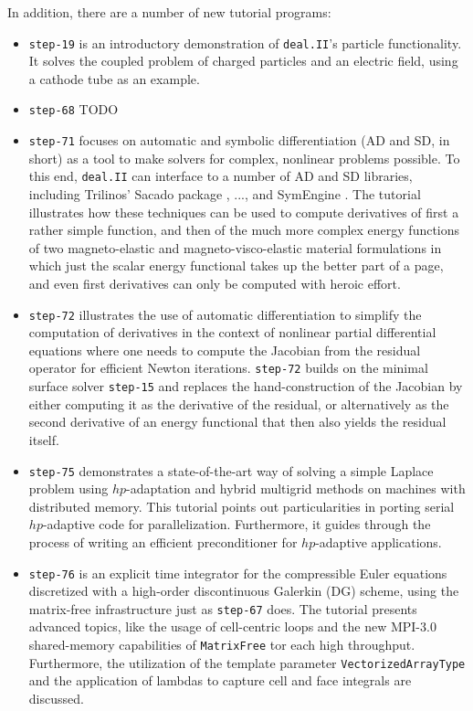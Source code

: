 \documentclass{ansarticle-preprint}
\newcommand{\specialword}[1]{\texttt{#1}}
\newcommand{\dealii}{{\specialword{deal.II}}\xspace}
\begin{document}
In addition, there are a number of new tutorial programs:
\begin{itemize}
\item \texttt{step-19} is an introductory demonstration of \dealii{}'s
  particle functionality. It solves the coupled problem of
  charged particles and an electric field, using a cathode tube as an
  example. 

\item \texttt{step-68} TODO

\item \texttt{step-71} focuses on automatic and symbolic
  differentiation (AD and SD, in short) as a tool to make solvers for complex, nonlinear
  problems possible. To this end, \dealii{} can interface to a number
  of AD and SD libraries, including Trilinos' Sacado package
  \cite{...}, ..., and SymEngine \cite{symengine-web-page}. The tutorial
  illustrates how these techniques can be used to compute derivatives
  of first a rather simple function, and then of the much more complex
  energy functions of two magneto-elastic and magneto-visco-elastic
  material formulations in which just the scalar energy functional
  takes up the better part of a page, and even first derivatives can
  only be computed with heroic effort.

\item \texttt{step-72} illustrates the use of automatic
  differentiation to simplify the computation of derivatives in the
  context of nonlinear partial differential equations where one needs
  to compute the Jacobian from the residual operator for efficient
  Newton iterations. \texttt{step-72} builds on the minimal surface
  solver \texttt{step-15} and replaces the hand-construction of the
  Jacobian by either computing it as the derivative of the residual,
  or alternatively as the second derivative of an energy functional
  that then also yields the residual itself.

\item \texttt{step-75} demonstrates a state-of-the-art way of solving a simple
      Laplace problem using $hp$-adaptation and hybrid multigrid methods on machines
      with distributed memory. This tutorial points out particularities in porting
      serial $hp$-adaptive code for parallelization. Furthermore, it guides through
      the process of writing an efficient preconditioner for $hp$-adaptive applications.

\item \texttt{step-76} is an explicit time integrator for the
      compressible Euler equations discretized with a high-order discontinuous
      Galerkin (DG) scheme, using the matrix-free infrastructure just as \texttt{step-67} does.
      The tutorial presents advanced topics, like the usage of cell-centric loops and
      the new MPI-3.0 shared-memory capabilities of \texttt{MatrixFree} tor each high
      throughput. Furthermore, the utilization of the template parameter
      \texttt{VectorizedArrayType} and the application of lambdas to capture cell and face
      integrals are discussed.


\end{itemize}
\end{document}
